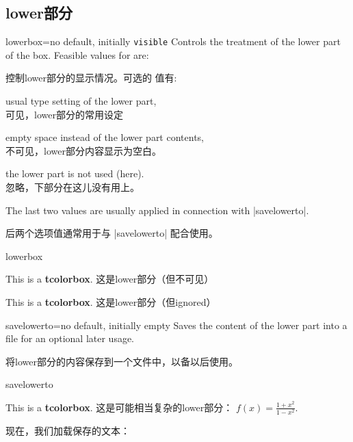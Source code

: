 \subsection{lower部分}

\begin{docTcbKey}{lowerbox}{=}{no default, initially \texttt{visible}}
Controls the treatment of the lower part of the box.
Feasible values for  are:

控制lower部分的显示情况。可选的  值有:
\begin{DescriptionL}{}
\item[\docValue{visible}]usual type setting of the lower part,
\\可见，lower部分的常用设定

\item[\docValue{invisible}]empty space instead of the lower part contents,
\\不可见，lower部分内容显示为空白。

\item[\docValue{ignored}]the lower part is not used (here).
\\忽略，下部分在这儿没有用上。
\end{DescriptionL}

The last two values are usually applied in connection with |savelowerto|.

后两个选项值通常用于与 |savelowerto| 配合使用。

\begin{exdispExample}{lowerbox}
\begin{tcolorbox}[lowerbox=invisible,colback=white]
This is a \textbf{tcolorbox}.
\tcblower
这是lower部分（但不可见）
\end{tcolorbox}

\begin{tcolorbox}[lowerbox=ignored,colback=white]
This is a \textbf{tcolorbox}.
\tcblower
这是lower部分（但ignored）
\end{tcolorbox}
\end{exdispExample}
\end{docTcbKey}


\begin{docTcbKey}[][doc updated=2014-11-28]{savelowerto}{=}{no default, initially empty}
Saves the content of the lower part into a file for an optional later usage.

将lower部分的内容保存到一个文件中，以备以后使用。
\begin{exdispExample}{savelowerto}
\begin{tcolorbox}[lowerbox=invisible,savelowerto=\jobname_bspsave.tex,colback=white]
This is a \textbf{tcolorbox}.
\tcblower
这是可能相当复杂的lower部分：
$\displaystyle f(x)=\frac{1+x^2}{1-x^2}$.
\end{tcolorbox}

现在，我们加载保存的文本：\\

\end{exdispExample}
\end{docTcbKey}



